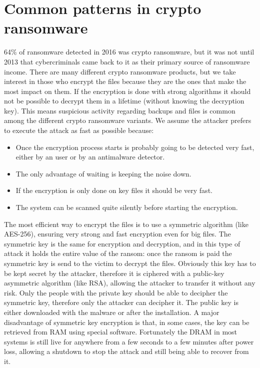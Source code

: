 \section{Common patterns in crypto ransomware}
64\% of ransomware detected in 2016 was crypto ransomware\cite{ransomware_digital_extortion}, but it was not until 2013 that cybercriminals came back to it as their primary source of ransomware income\cite{ransomware_oReilly}.
There are many different crypto ransomware products, but we take interest in those who encrypt the files because they are the ones that make the most impact on them.
If the encryption is done with strong algorithms it should not be possible to decrypt them in a lifetime (without knowing the decryption key).
\linej
\linej
This means suspicious activity regarding backups and files is common among the different crypto ransomware variants.
We assume the attacker prefers to execute the attack as fast as possible because:
\begin{itemize}
\item Once the encryption process starts is probably going to be detected very fast, either by an user or by an antimalware detector.
\item The only advantage of waiting is keeping the noise down.
\item If the encryption is only done on key files it should be very fast.
\item The system can be scanned quite silently before starting the encryption.
\end{itemize}
\linej
The most efficient way to encrypt the files is to use a symmetric algorithm (like AES-256), ensuring very strong and fast encryption even for big files.
The symmetric key is the same for encryption and decryption, and in this type of attack it holds the entire value of the ransom: once the ransom is paid the symmetric key is send to the victim to decrypt the files.
\linej
Obviously this key has to be kept secret by the attacker, therefore it is ciphered with a public-key asymmetric algorithm (like RSA), allowing the attacker to transfer it without any risk.
Only the people with the private key should be able to decipher the symmetric key, therefore only the attacker can decipher it.
The public key is either downloaded with the malware or after the installation.
\linej
A major disadvantage of symmetric key encryption is that, in some cases, the key can be retrieved from RAM using special software.
Fortunately the DRAM in most systems is still live for anywhere from a few seconds to a few minutes after power loss, allowing a shutdown to stop the attack and still being able to recover from it.

